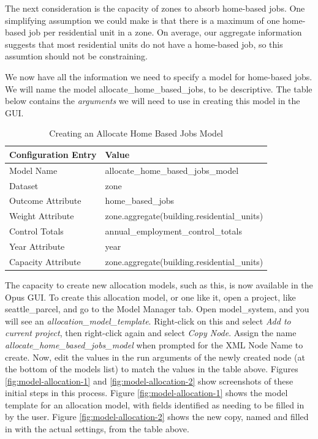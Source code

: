 The next consideration is the capacity of zones to absorb home-based jobs.  One simplifying assumption we could make is that there is a maximum of one home-based job per residential unit in a zone.  On average, our aggregate information suggests that most residential units do not have a home-based job, so this assumtion should not be constraining.

We now have all the information we need to specify a model for home-based jobs.  We will name the model allocate\_home\_based\_jobs, to be descriptive.  The table below contains the \emph{arguments} we will need to use in creating this model in the GUI.

\begin{table}[htp]
\caption{Creating an Allocate Home Based Jobs Model}
\label{tab:allocation-model}
\begin{center}
\begin{tabular}{ p{1.5in}  p{4.4in}  }
\toprule[1.5pt]
Configuration Entry & Value \\
\midrule
Model Name & allocate\_home\_based\_jobs\_model \\
Dataset & zone \\
Outcome Attribute & home\_based\_jobs \\
Weight Attribute & zone.aggregate(building.residential\_units) \\
Control Totals & annual\_employment\_control\_totals \\
Year Attribute & year \\
Capacity Attribute & zone.aggregate(building.residential\_units) \\
\bottomrule
\end{tabular}
\end{center}
\end{table}

The capacity to create new allocation models, such as this, is now available in the Opus GUI.  To create this allocation model, or one like it, open a project, like seattle\_parcel, and go to the Model Manager tab.  Open model\_system, and you will see an \emph{allocation\_model\_template}.  Right-click on this and select \emph{Add to current project}, then right-click again and select \emph{Copy Node}.  Assign the name \emph{allocate\_home\_based\_jobs\_model} when prompted for the XML Node Name to create.  Now, edit the values in the run arguments of the newly created node (at the bottom of the models list) to match the values in the table above. Figures \ref{fig:model-allocation-1} and \ref{fig:model-allocation-2} show screenshots of these initial steps in this process.  Figure \ref{fig:model-allocation-1} shows the model template for an allocation model, with fields identified as needing to be filled in by the user. Figure \ref{fig:model-allocation-2} shows the new copy, named and filled in with the actual settings, from the table above. 


